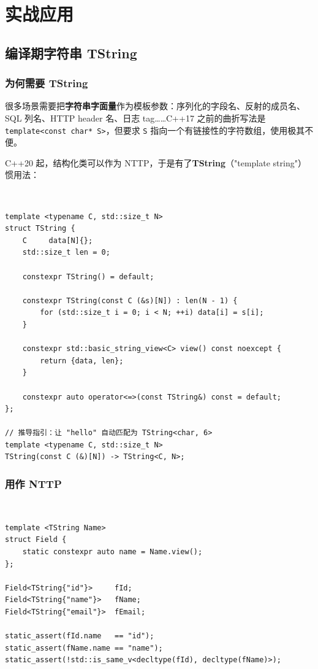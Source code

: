 \documentclass[12pt,a4paper,fontset=fandol]{ctexbook}
\newcommand{\cppxxlabel}[1]{%
  \tcbox[on line,colback=cpp20bg,colframe=cpp20bg,
    boxrule=0pt,arc=1pt,left=2pt,right=2pt,top=1pt,bottom=1pt,
    colupper=white,fontupper=\scriptsize\bfseries]{#1}}
\newcommand{\cpp}[1]{C++#1}
\newcommand{\kw}[1]{\texttt{#1}}
\begin{document}
\part{实战应用}

\chapter{编译期字符串 TString}

\section{为何需要 TString}

很多场景需要把\textbf{字符串字面量}作为模板参数：序列化的字段名、反射的成员名、SQL 列名、HTTP header 名、日志 tag……\cpp{17} 之前的曲折写法是\kw{template<const char* S>}，但要求 \kw{S} 指向一个有链接性的字符数组，使用极其不便。

\cpp{20} 起，结构化类可以作为 NTTP，于是有了\textbf{TString}（"template string"）惯用法：

\cppxxlabel{C++20}\ \begin{lstlisting}
template <typename C, std::size_t N>
struct TString {
    C     data[N]{};
    std::size_t len = 0;

    constexpr TString() = default;

    constexpr TString(const C (&s)[N]) : len(N - 1) {
        for (std::size_t i = 0; i < N; ++i) data[i] = s[i];
    }

    constexpr std::basic_string_view<C> view() const noexcept {
        return {data, len};
    }

    constexpr auto operator<=>(const TString&) const = default;
};

// 推导指引：让 "hello" 自动匹配为 TString<char, 6>
template <typename C, std::size_t N>
TString(const C (&)[N]) -> TString<C, N>;
\end{lstlisting}

\section{用作 NTTP}

\cppxxlabel{C++20}\ \begin{lstlisting}
template <TString Name>
struct Field {
    static constexpr auto name = Name.view();
};

Field<TString{"id"}>     fId;
Field<TString{"name"}>   fName;
Field<TString{"email"}>  fEmail;

static_assert(fId.name   == "id");
static_assert(fName.name == "name");
static_assert(!std::is_same_v<decltype(fId), decltype(fName)>);
\end{lstlisting}
\end{document}
